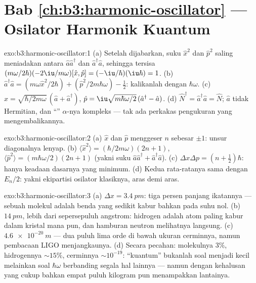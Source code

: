 \section*{Bab \ref{ch:b3:harmonic-oscillator} --- Osilator Harmonik Kuantum}

\begin{solution}{exo:b3:harmonic-oscillator:1}
(a) Setelah dijabarkan, suku $\hat x^2$ dan $\hat p^2$ saling meniadakan
antara $\hat a\hat a^\dagger$ dan $\hat a^\dagger\hat a$, sehingga
tersisa $(m\omega/2\hbar)(-2\iu/m\omega)[\hat x, \hat p] =
(-\iu/\hbar)(\iu\hbar) = 1$. (b) $\hat a^\dagger\hat a = (m\omega\hat x^2/2\hbar) +
(\hat p^2/2m\hbar\omega) - \tfrac12$: kalikanlah dengan $\hbar\omega$. (c)
$\hat x = \sqrt{\hbar/2m\omega}\,(\hat a + \hat a^\dagger)$, $\hat p
= \iu\sqrt{m\hbar\omega/2}\,(\hat a^\dagger - \hat a)$. (d) $\hat
N^\dagger = \hat a^\dagger\hat a = \hat N$; $\hat a$ tidak Hermitian,
dan ``'' $\alpha$-nya kompleks --- tak ada perkakas
pengukuran yang mengembalikannya.
\end{solution}

\begin{solution}{exo:b3:harmonic-oscillator:2}
(a) $\hat x$ dan $\hat p$ menggeser $n$ sebesar $\pm1$: unsur
diagonalnya lenyap. (b) $\langle\hat x^2\rangle = (\hbar/2m\omega)(2n + 1)$,
$\langle\hat p^2\rangle = (m\hbar\omega/2)(2n + 1)$ (yakni suku $\hat
a\hat a^\dagger + \hat a^\dagger\hat a$). (c) $\Delta x\Delta p
= (n + \tfrac12)\hbar$: hanya keadaan dasarnya yang minimum. (d) Kedua
rata-ratanya sama dengan $E_n/2$: yakni ekipartisi osilator klasiknya,
aras demi aras.
\end{solution}

\begin{solution}{exo:b3:harmonic-oscillator:3}
(a) $\Delta x = \qty{3.4}{pm}$: tiga persen panjang ikatannya --- sebuah
molekul adalah benda yang sedikit kabur bahkan pada suhu nol. (b)
$\qty{14}{pm}$, lebih dari sepersepuluh angstrom: hidrogen adalah atom
paling kabur dalam kristal mana pun, dan hamburan neutron melihatnya
langsung. (c) $\qty{4.6e-20}{m}$ --- dua puluh lima orde di bawah ukuran
cerminnya, namun pembacaan LIGO menjangkaunya. (d) Secara pecahan:
molekulnya $3\%$, hidrogennya $\sim15\%$, cerminnya $\sim10^{-19}$:
``kuantum'' bukanlah soal menjadi kecil melainkan soal $\hbar\omega$
berbanding segala hal lainnya --- namun dengan kehalusan yang cukup
bahkan empat puluh kilogram pun menampakkan lantainya.
\end{solution}

